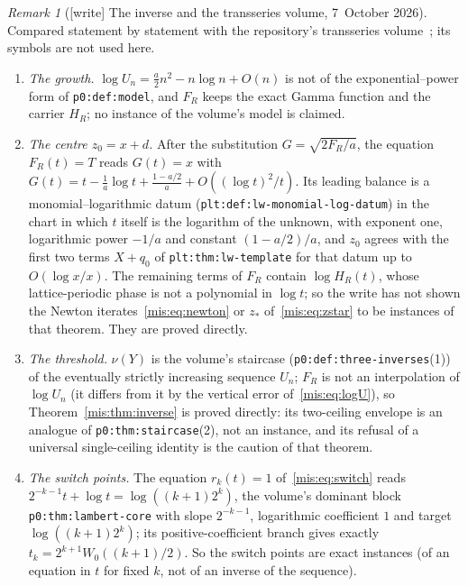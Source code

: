 \documentclass[11pt]{article}
\theoremstyle{remark}\newtheorem{remark}[theorem]{Remark}
\newcommand{\file}[1]{\nolinkurl{#1}}
\begin{document}
\begin{remark}[{[write]} The inverse and the transseries volume, 7~October 2026]\label{mis:rem:transseries}
Compared statement by statement with the repository's transseries
volume~\cite{TSvol}; its symbols are not used here.
\begin{enumerate}\raggedright
\item \emph{The growth.} $\log U_n=\frac a2n^2-n\log n+O(n)$ is not of the exponential--power form of \file{p0:def:model}, and $F_R$ keeps the exact Gamma function and the carrier $H_R$; no instance of the volume's model is claimed.
\item \emph{The centre $z_0=x+d$.} After the substitution $G=\sqrt{2F_R/a}$, the equation $F_R(t)=T$ reads $G(t)=x$ with $G(t)=t-\frac1a\log t+\frac{1-a/2}{a}+O((\log t)^2/t)$. Its leading balance is a monomial--logarithmic datum (\file{plt:def:lw-monomial-log-datum}) in the chart in which $t$ itself is the logarithm of the unknown, with exponent one, logarithmic power $-1/a$ and constant $(1-a/2)/a$, and $z_0$ agrees with the first two terms $X+q_0$ of \file{plt:thm:lw-template} for that datum up to $O(\log x/x)$. The remaining terms of $F_R$ contain $\log H_R(t)$, whose lattice-periodic phase is not a polynomial in $\log t$; so the write has not shown the Newton iterates~\eqref{mis:eq:newton} or $z_*$ of~\eqref{mis:eq:zstar} to be instances of that theorem. They are proved directly.
\item \emph{The threshold.} $\nu(Y)$ is the volume's staircase (\file{p0:def:three-inverses}(1)) of the eventually strictly increasing sequence $U_n$; $F_R$ is not an interpolation of $\log U_n$ (it differs from it by the vertical error of~\eqref{mis:eq:logU}), so Theorem~\ref{mis:thm:inverse} is proved directly: its two-ceiling envelope is an analogue of \file{p0:thm:staircase}(2), not an instance, and its refusal of a universal single-ceiling identity is the caution of that theorem.
\item \emph{The switch points.} The equation $r_k(t)=1$ of~\eqref{mis:eq:switch} reads $2^{-k-1}t+\log t=\log((k+1)2^k)$, the volume's dominant block \file{p0:thm:lambert-core} with slope $2^{-k-1}$, logarithmic coefficient $1$ and target $\log((k+1)2^k)$; its positive-coefficient branch gives exactly $t_k=2^{k+1}W_0((k+1)/2)$. So the switch points are exact instances (of an equation in $t$ for fixed $k$, not of an inverse of the sequence).
\end{enumerate}
\end{remark}
\end{document}
